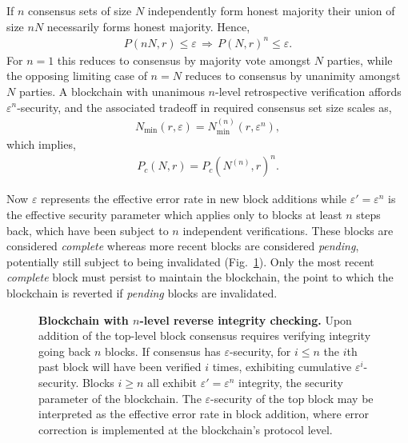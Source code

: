 \documentclass[twocolumn, aps, amsmath, amssymb, nofootinbib, superscriptaddress, longbibliography, floatfix, eqsecnum, rmp]{revtex4-2}
\begin{document}
If $n$ consensus sets of size $N$ independently form honest majority their union of size $nN$ necessarily forms honest majority. Hence,
\begin{align}
	P(nN,r)\leq\varepsilon \,\Rightarrow\, P(N,r)^n\leq\varepsilon.
\end{align}
For $n=1$ this reduces to consensus by majority vote amongst $N$ parties, while the opposing limiting case of $n=N$ reduces to consensus by unanimity amongst $N$ parties. A blockchain with unanimous $n$-level retrospective verification affords $\varepsilon^n$-security, and the associated tradeoff in required consensus set size scales as,
\begin{align}
	N_\mathrm{min}(r,\varepsilon) = N_\mathrm{min}^{(n)}(r,\varepsilon^n),
\end{align}
which implies,
\begin{align}
	P_c(N,r) = P_c(N^{(n)},r)^n.
\end{align}

Now $\varepsilon$ represents the effective error rate in new block additions while \mbox{$\varepsilon'=\varepsilon^n$} is the effective security parameter which applies only to blocks at least $n$ steps back, which have been subject to $n$ independent verifications. These blocks are considered \emph{complete} whereas more recent blocks are considered \emph{pending}, potentially still subject to being invalidated (Fig.~\ref{fig:backward_integrity}). Only the most recent \emph{complete} block must persist to maintain the blockchain, the point to which the blockchain is reverted if \emph{pending} blocks are invalidated.

\begin{figure}[!htb]

\caption{\textbf{Blockchain with $n$-level reverse integrity checking.} Upon addition of the top-level block consensus requires verifying integrity going back $n$ blocks. If consensus has $\varepsilon$-security, for $i\leq n$ the $i$th past block will have been verified $i$ times, exhibiting cumulative $\varepsilon^i$-security. Blocks $i\geq n$ all exhibit $\varepsilon'=\varepsilon^n$ integrity, the security parameter of the blockchain. The $\varepsilon$-security of the top block may be interpreted as the effective error rate in block addition, where error correction is implemented at the blockchain's protocol level.} \label{fig:backward_integrity}
\end{figure}
\end{document}
